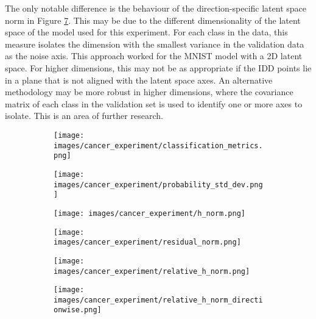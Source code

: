 \documentclass{article}
\begin{document}
The only notable difference is the behaviour of the direction-specific latent space norm in Figure \ref{res:cancer relative h norm directionwise}. This may be due to the different dimensionality of the latent space of the model used for this experiment. For each class in the data, this measure isolates the dimension with the smallest variance in the validation data as the noise axis. This approach worked for the MNIST model with a 2D latent space. For higher dimensions, this may not be as appropriate if the IDD points lie in a plane that is not aligned with the latent space axes. An alternative methodology may be more robust in higher dimensions, where the covariance matrix of each class in the validation set is used to identify one or more axes to isolate. This is an area of further research.


\begin{figure}[ht]

\begin{subfigure}{.33\linewidth}
  \texttt{[image: images/cancer\_experiment/classification\_metrics.png]}
  \caption{}
  \label{res:cancer accuracy}
\end{subfigure}\hfill %
\begin{subfigure}{.33\linewidth}
  \texttt{[image: images/cancer\_experiment/probability\_std\_dev.png]}
  \caption{}
  \label{res:cancer prob std}
\end{subfigure}\hfill %
\begin{subfigure}{.33\linewidth}
  \texttt{[image: images/cancer\_experiment/h\_norm.png]}
  \caption{}
  \label{res:cancer h norm}
\end{subfigure}


\begin{subfigure}{.33\linewidth}
  \texttt{[image: images/cancer\_experiment/residual\_norm.png]}
  \caption{}
  \label{res:cancer r norm}
\end{subfigure}\hfill %
\begin{subfigure}{.33\linewidth}
  \texttt{[image: images/cancer\_experiment/relative\_h\_norm.png]}
  \caption{}
  \label{res:cancer relative h norm}
\end{subfigure}\hfill %
\begin{subfigure}{.33\linewidth}
  \texttt{[image: images/cancer\_experiment/relative\_h\_norm\_directionwise.png]}
  \caption{}
  \label{res:cancer relative h norm directionwise}
\end{subfigure}


\end{figure}
\end{document}
